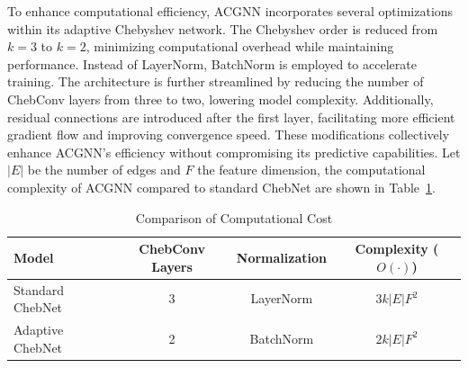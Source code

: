 To enhance computational efficiency, ACGNN incorporates several optimizations within its adaptive Chebyshev network. The Chebyshev order is reduced from $k=3$ to $k=2$, minimizing computational overhead while maintaining performance. Instead of LayerNorm, BatchNorm is employed to accelerate training. The architecture is further streamlined by reducing the number of ChebConv layers from three to two, lowering model complexity. Additionally, residual connections are introduced after the first layer, facilitating more efficient gradient flow and improving convergence speed. These modifications collectively enhance ACGNN’s efficiency without compromising its predictive capabilities.
Let $|E|$ be the number of edges and $F$ the feature dimension, the computational complexity of ACGNN  compared to standard ChebNet are shown in Table~\ref{tab:comp_cost}.
\begin{table}[h]
	\centering
	\captionsetup{font=small}
\scriptsize
	\begin{tabular}{lccc}
		\toprule
		Model & ChebConv Layers & Normalization & Complexity ($O(\cdot)$) \\
		\midrule
		Standard ChebNet & 3 & LayerNorm & $3k |E| F^2$ \\
		Adaptive ChebNet & 2 & BatchNorm & \textbf{$2k |E| F^2$} \\
		\bottomrule
	\end{tabular}
	\caption{Comparison of Computational Cost}
	\label{tab:comp_cost}
\end{table}



